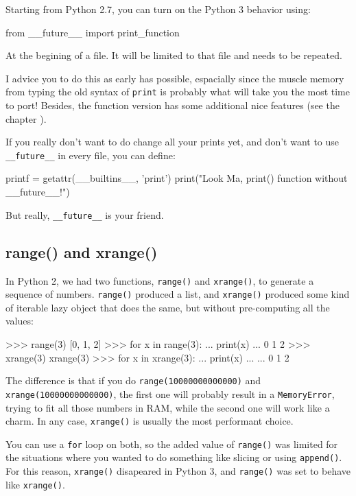 Starting from Python 2.7, you can turn on the Python 3 behavior using:

\begin{py2and3}
from __future__ import print_function
\end{py2and3}

At the begining of a file. It will be limited to that file and needs to be repeated.

I advice you to do this as early has possible, espacially since the muscle memory from typing the old syntax of \lstinline{print} is probably what will take you the most time to port! Besides, the function version has some additional nice features (see the chapter ).

If you really don't want to do change all your prints yet, and don't want to use \lstinline{__future__} in every file, you can define:

\begin{py2and3}
printf = getattr(__builtins__, 'print')
print("Look Ma, print() function without __future__!")
\end{py2and3}

But really, \lstinline{__future__} is your friend.

\subsection{range() and xrange()}

In Python 2, we had two functions, \lstinline{range()} and \lstinline{xrange()}, to generate a sequence of numbers. \lstinline{range()} produced a list, and \lstinline{xrange()} produced some kind of iterable lazy object that does the same, but without pre-computing all the values:

\begin{py2}
>>> range(3)
[0, 1, 2]
>>> for x in range(3):
...     print(x)
...
0
1
2
>>> xrange(3)
xrange(3)
>>> for x in xrange(3):
...     print(x)
...
...
0
1
2
\end{py2}

The difference is that if you do \lstinline{range(10000000000000)} and \lstinline{xrange(10000000000000)}, the first one will probably result in a \lstinline{MemoryError}, trying to fit all those numbers in RAM, while the second one will work like a charm. In any case, \lstinline{xrange()} is usually the most performant choice.

You can use a \lstinline{for} loop on both, so the added value of \lstinline{range()} was limited for the situations where you wanted to do something like slicing or using \lstinline{append()}. For this reason, \lstinline{xrange()} disapeared in Python 3, and \lstinline{range()} was set to behave like \lstinline{xrange()}.

